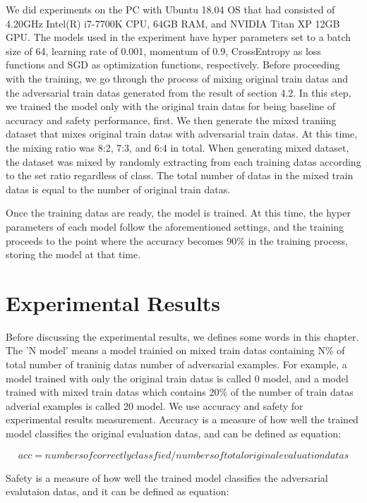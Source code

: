 \documentclass[journal,article,submit,moreauthors,pdftex]{Definitions/mdpi}
\begin{document}
We did experiments on the PC with Ubuntu 18.04 OS that had consisted of 4.20GHz Intel(R) i7-7700K CPU, 64GB RAM, and NVIDIA Titan XP 12GB GPU. The models used in the experiment have hyper parameters set to a batch size of 64, learning rate of 0.001, momentum of 0.9, CrossEntropy as loss functions and SGD as optimization functions, respectively.
Before proceeding with the training, we go through the process of mixing original train datas and the adversarial train datas generated from the result of section 4.2.
In this step, we trained the model only with the original train datas for being baseline of accuracy and safety performance, first. We then generate the mixed traniing dataset that mixes original train datas with adversarial train datas.
At this time, the mixing ratio was 8:2, 7:3, and 6:4 in total. When generating mixed dataset, the dataset was mixed by randomly extracting from each training datas according to the set ratio regardless of class.
The total number of datas in the mixed train datas is equal to the number of original train datas.

Once the training datas are ready, the model is trained. At this time, the hyper parameters of each model follow the aforementioned settings, and the training proceeds to the point where the accuracy becomes 90\% in the training process, storing the model at that time.

\section{Experimental Results}

Before discussing the experimental results, we defines some words in this chapter. The 'N model' means a model trainied on mixed train datas containing N\% of total number of traninig datas number of adversarial examples.
For example, a model trained with only the original train datas is called 0 model, and a model trained with mixed train datas which contains 20\% of the number of train datas adverial examples is called 20 model.
We use accuracy and safety for experimental results measurement. Accuracy is a measure of how well the trained model classifies the original evaluation datas, and can be defined as equation:

\begin{equation}
    acc = numbers of correctly classfied / numbers of total original evaluation datas
\end{equation}

Safety is a measure of how well the trained model classifies the adversarial evalutaion datas, and it can be defined as equation:
\end{document}
